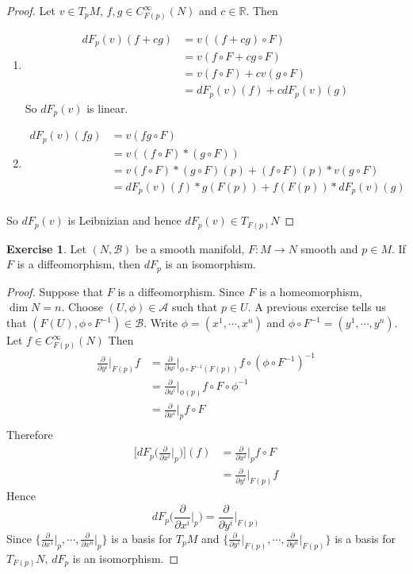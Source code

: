 \documentclass{book}
\theoremstyle{definition}
\newtheorem{ex}[definition]{Exercise}
\newcommand{\R}{\mathbb{R}}
\newcommand{\MA}{\mathcal{A}}
\newcommand{\MB}{\mathcal{B}}
\DeclareMathOperator*{\0}{\mbf{0}}
\DeclareMathOperator*{\1}{\mbf{1}}
\newcommand{\p}{\partial}
\begin{document}
	\begin{proof}
	Let $v \in T_pM$, $f,g \in C_{F(p)}^{\infty}(N)$ and $c \in \R$. Then 
	\begin{enumerate}
	\item 
	\begin{align*}
		dF_p(v)(f+cg) 
		&= v((f+cg) \circ F) \\
		&= v(f \circ F + c g \circ F) \\
		&= v(f \circ F) + cv(g \circ F) \\
		&= dF_p(v)(f) + c dF_p(v)(g)
	\end{align*}
	So $dF_p(v)$ is linear.
	\item 
	\begin{align*}
	dF_p(v)(fg) 
	&= v (fg \circ F) \\
	&= v((f \circ F)* (g \circ F)) \\
	&= v(f \circ F)*(g \circ F)(p) +  (f \circ F)(p)* v(g \circ F) \\
	&= dF_p(v)(f) * g(F(p)) + f(F(p))*dF_p(v)(g) \\
	\end{align*}
	\end{enumerate}
	So $dF_p(v)$ is Leibnizian and hence $dF_p(v) \in T_{F(p)}N$
	\end{proof}

	\begin{ex}
		Let $(N, \MB)$ be a smooth manifold, $F: M \rightarrow N$ smooth and $p \in M$. If $F$ is a diffeomorphism, then $dF_p$ is an isomorphism.
	\end{ex}
	
	\begin{proof}
		Suppose that $F$ is a diffeomorphism. Since $F$ is a homeomorphism, $\dim N = n$. Choose $(U, \phi) \in \MA$ such that $p \in U$. A previous exercise tells us that $(F(U), \phi \circ F^{-1}) \in \MB$. Write $\phi = (x^1, \cdots, x^n)$ and $\phi \circ F^{-1} = (y^1, \cdots, y^n)$. Let $f \in C^{\infty}_{F(p)}(N)$ Then 
		\begin{align*}
			\frac{\p}{\p y^i} \bigg|_{F(p)} f
			&= 	\frac{\p}{\p u^i} \bigg|_{\phi \circ F^{-1} (F(p))} f \circ (\phi \circ F^{-1})^{-1} \\
			&= 	\frac{\p}{\p u^i} \bigg|_{\phi(p)} f \circ F \circ \phi^{-1} \\
			&= 	\frac{\p}{\p x^i} \bigg|_p f \circ F \\
		\end{align*}
		Therefore 
		\begin{align*}
			\bigg[ dF_p \bigg( \frac{\p}{\p x^i} \bigg|_p \bigg) \bigg] (f)
			&= \frac{\p}{\p x^i} \bigg|_p f \circ F \\
			&= \frac{\p}{\p y^i} \bigg|_{F(p)} f 
		\end{align*}
	Hence $$dF_p \bigg( \frac{\p}{\p x^i} \bigg|_p \bigg) = \frac{\p}{\p y^i} \bigg|_{F(p)}$$ 
	Since $\bigg \{\frac{\p}{\p x^1} \bigg|_p, \cdots, \frac{\p}{\p x^n} \bigg|_p \bigg \}$ is a basis for $T_pM$ and $\bigg \{\frac{\p}{\p y^1} \bigg|_{F(p)}, \cdots, \frac{\p}{\p y^n} \bigg|_{F(p)} \bigg \}$ is a basis for $T_{F(p)}N$, $dF_p$ is an isomorphism.
	\end{proof}
\end{document}
